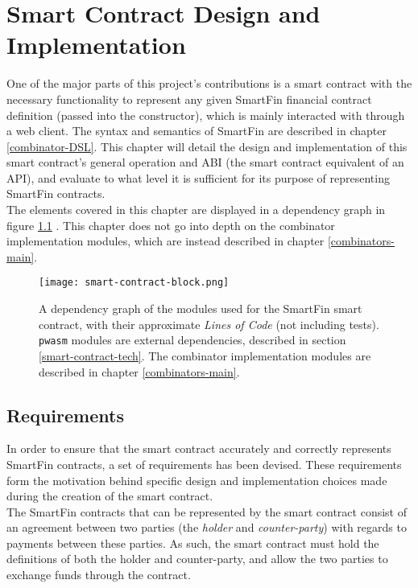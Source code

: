 \chapter{Smart Contract Design and Implementation} \label{smart-contract-impl}

One of the major parts of this project's contributions is a smart contract with the necessary functionality to represent any given SmartFin financial contract definition (passed into the constructor), which is mainly interacted with through a web client. The syntax and semantics of SmartFin are described in chapter \ref{combinator-DSL}. This chapter will detail the design and implementation of this smart contract's general operation and ABI (the smart contract equivalent of an API), and evaluate to what level it is sufficient for its purpose of representing SmartFin contracts. \\

The elements covered in this chapter are displayed in a dependency graph in figure \ref{fig:smart-contract-block} . This chapter does not go into depth on the combinator implementation modules, which are instead described in chapter \ref{combinators-main}. \\

\begin{figure}[h]
    \centering
    \texttt{[image: smart-contract-block.png]}
    \caption{A dependency graph of the modules used for the SmartFin smart contract, with their approximate \textit{Lines of Code} (not including tests). \texttt{pwasm} modules are external dependencies, described in section \ref{smart-contract-tech}. The combinator implementation modules are described in chapter \ref{combinators-main}.}
    \label{fig:smart-contract-block}
\end{figure}


\section{Requirements} \label{contract-requirements}

In order to ensure that the smart contract accurately and correctly represents SmartFin contracts, a set of requirements has been devised. These requirements form the motivation behind specific design and implementation choices made during the creation of the smart contract. \\

The SmartFin contracts that can be represented by the smart contract consist of an agreement between two parties (the \textit{holder} and \textit{counter-party}) with regards to payments between these parties. As such, the smart contract must hold the definitions of both the holder and counter-party, and allow the two parties to exchange funds through the contract. \\

